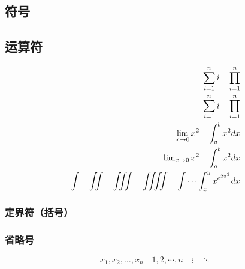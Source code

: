 \documentclass[UTF8]{article}
\begin{document}
 \subsection{符号}
 \subsection{运算符}
     \begin{align}
         \sum_{i=1}^n i \quad \prod_{i=1}^n                      \\
         \sum\limits_{i=1}^n i \quad \prod\limits_{i=1}^n        \\
         \lim_{x\to0}x^2 \quad \int_a^b x^2 dx                   \\
         \lim\nolimits_{x\to0}x^2 \quad \int\nolimits_a^b x^2 dx \\
         \int\quad \iint \quad \iiint \quad \iiiint \quad \idotsint_x^y x^{e^{2\pi^2}} dx
     \end{align}
     \subsubsection{定界符（括号）}
     \subsubsection{省略号}
         \[ x_1,x_2,\dots ,x_n\quad 1,2,\cdots ,n\quad
             \vdots\quad \ddots \]
\end{document}
